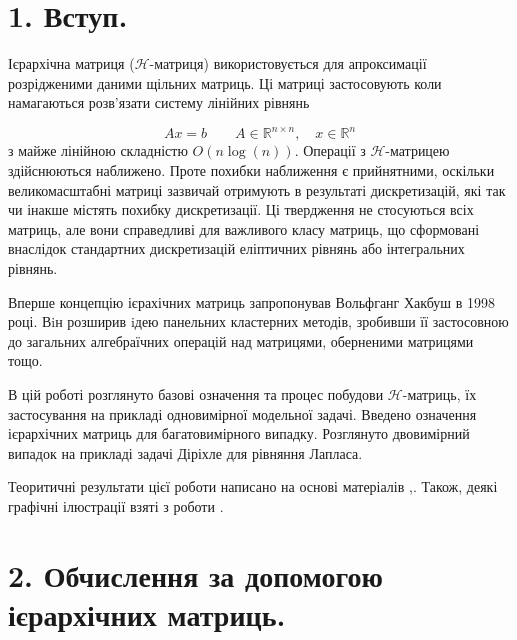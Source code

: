 \documentclass[12pt]{report}
\begin{document}
\chapter{1. Вступ.}
	\hspace{0.8cm} Ієрархічна матриця ($\mathcal{H}$-матриця) використовується для апроксимації розрідженими даними щільних матриць. Ці матриці застосовують коли намагаються розв'язати систему лінійних рівнянь
	
	 $$ Ax=b \quad\quad  A \in \mathbb{R}^{n\times n} ,\quad   x\in \mathbb{R}^n$$ \newline
	 з майже лінійною складністю $O(n\log(n))$. Операції з $\mathcal{H}$-матрицею здійснюються наближено. Проте похибки наближення є прийнятними, оскільки великомасштабні матриці зазвичай отримують в результаті дискретизацій, які так чи інакше містять похибку дискретизації. Ці твердження не стосуються всіх матриць, але вони справедливі для важливого класу матриць, що сформовані внаслідок стандартних дискретизацій еліптичних рівнянь або інтегральних рівнянь. 
	 \par Вперше концепцію ієрахічних матриць запропонував Вольфганг Хакбуш  в 1998 році. Вiн розширив iдею панельних кластерних методів, зробивши її застосовною до загальних алгебраїчних операцій над матрицями, оберненими матрицями тощо. 
	 \par В цій роботі розглянуто базові означення та процес побудови $\mathcal{H}$-матриць, їх застосування на прикладі одновимірної модельної задачі. Введено означення ієрархічних матриць для  багатовимірного випадку. Розглянуто двовимірний випадок на прикладі задачі Діріхле для рівняння Лапласа.
	 \par Теоритичні результати цієї роботи написано на основі матеріалів \cite{HM},\cite{Diss}. Також, деякі графічні ілюстрації взяті з роботи \cite{HM}.
	 
	
\newpage
\chapter{2. Обчислення за допомогою ієрархічних матриць.}
\end{document}
